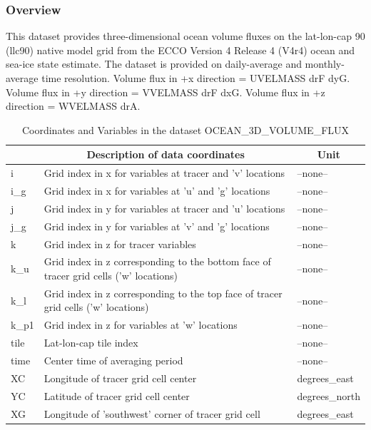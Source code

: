 \subsubsection{Overview}
This dataset provides three-dimensional ocean volume fluxes on the lat-lon-cap 90 (llc90) native model grid from the ECCO Version 4 Release 4 (V4r4) ocean and sea-ice state estimate. The dataset is provided on daily-average and monthly-average time resolution. Volume flux in +x direction = UVELMASS drF dyG. Volume flux in +y direction = VVELMASS drF dxG. Volume flux in +z direction = WVELMASS drA. 
\begin{longtable}{|m{}|m{}|m{}|}
\caption{Coordinates and Variables in the dataset OCEAN\_3D\_VOLUME\_FLUX}
\label{tab:table-OCEAN_3D_VOLUME_FLUX-fields} \\ 
\hline \endhead \hline \endfoot
\rowcolor{lightgray} \multicolumn{1}{|c|}{\textbf{Coordinates}} & \multicolumn{1}{|c|}{\textbf{Description of data coordinates}} &  \multicolumn{1}{|c|}{\textbf{Unit}}\\ \hline
i &Grid index in x for variables at tracer and 'v' locations &--none--  \\ \hline
i\_g &Grid index in x for variables at 'u' and 'g' locations &--none--  \\ \hline
j &Grid index in y for variables at tracer and 'u' locations &--none--  \\ \hline
j\_g &Grid index in y for variables at 'v' and 'g' locations &--none--  \\ \hline
k &Grid index in z for tracer variables &--none--  \\ \hline
k\_u &Grid index in z corresponding to the bottom face of tracer grid cells ('w' locations) &--none--  \\ \hline
k\_l &Grid index in z corresponding to the top face of tracer grid cells ('w' locations) &--none--  \\ \hline
k\_p1 &Grid index in z for variables at 'w' locations &--none--  \\ \hline
tile &Lat-lon-cap tile index &--none--  \\ \hline
time &Center time of averaging period &--none--  \\ \hline
XC &Longitude of tracer grid cell center &degrees\_east  \\ \hline
YC &Latitude of tracer grid cell center &degrees\_north  \\ \hline
XG &Longitude of 'southwest' corner of tracer grid cell &degrees\_east  \\ \hline

\end{longtable}
